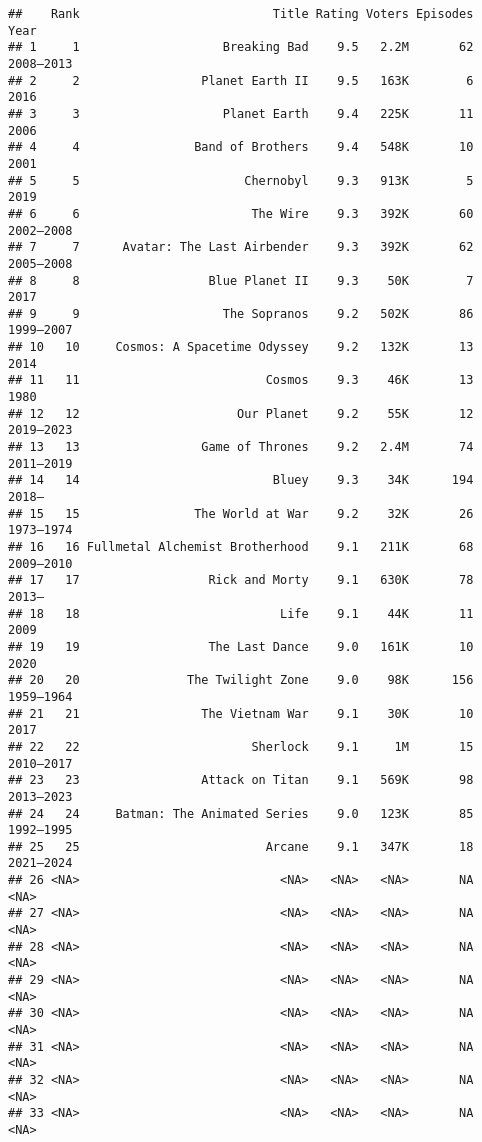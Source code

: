 \documentclass[
]{article}
\begin{document}
\begin{verbatim}
##    Rank                           Title Rating Voters Episodes      Year
## 1     1                    Breaking Bad    9.5   2.2M       62 2008–2013
## 2     2                 Planet Earth II    9.5   163K        6      2016
## 3     3                    Planet Earth    9.4   225K       11      2006
## 4     4                Band of Brothers    9.4   548K       10      2001
## 5     5                       Chernobyl    9.3   913K        5      2019
## 6     6                        The Wire    9.3   392K       60 2002–2008
## 7     7      Avatar: The Last Airbender    9.3   392K       62 2005–2008
## 8     8                  Blue Planet II    9.3    50K        7      2017
## 9     9                    The Sopranos    9.2   502K       86 1999–2007
## 10   10     Cosmos: A Spacetime Odyssey    9.2   132K       13      2014
## 11   11                          Cosmos    9.3    46K       13      1980
## 12   12                      Our Planet    9.2    55K       12 2019–2023
## 13   13                 Game of Thrones    9.2   2.4M       74 2011–2019
## 14   14                           Bluey    9.3    34K      194    2018– 
## 15   15                The World at War    9.2    32K       26 1973–1974
## 16   16 Fullmetal Alchemist Brotherhood    9.1   211K       68 2009–2010
## 17   17                  Rick and Morty    9.1   630K       78    2013– 
## 18   18                            Life    9.1    44K       11      2009
## 19   19                  The Last Dance    9.0   161K       10      2020
## 20   20               The Twilight Zone    9.0    98K      156 1959–1964
## 21   21                 The Vietnam War    9.1    30K       10      2017
## 22   22                        Sherlock    9.1     1M       15 2010–2017
## 23   23                 Attack on Titan    9.1   569K       98 2013–2023
## 24   24     Batman: The Animated Series    9.0   123K       85 1992–1995
## 25   25                          Arcane    9.1   347K       18 2021–2024
## 26 <NA>                            <NA>   <NA>   <NA>       NA      <NA>
## 27 <NA>                            <NA>   <NA>   <NA>       NA      <NA>
## 28 <NA>                            <NA>   <NA>   <NA>       NA      <NA>
## 29 <NA>                            <NA>   <NA>   <NA>       NA      <NA>
## 30 <NA>                            <NA>   <NA>   <NA>       NA      <NA>
## 31 <NA>                            <NA>   <NA>   <NA>       NA      <NA>
## 32 <NA>                            <NA>   <NA>   <NA>       NA      <NA>
## 33 <NA>                            <NA>   <NA>   <NA>       NA      <NA>

\end{verbatim}
\end{document}

